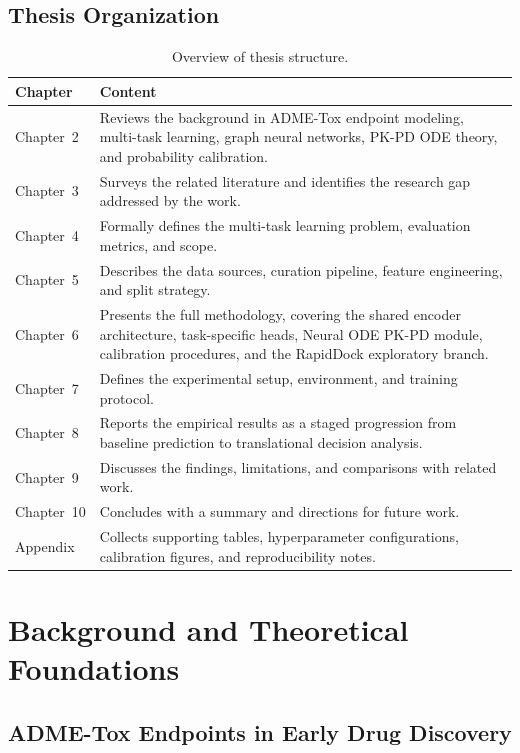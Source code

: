 \documentclass[a4paper,11pt,twoside]{report}
\begin{document}
\section{Thesis Organization}

\begin{table}[htbp]
\centering
\small
\caption{Overview of thesis structure.}
\begin{tabular}{p{2.8cm} p{9.5cm}}
\hline
\textbf{Chapter} & \textbf{Content} \\
\hline
Chapter~2 & Reviews the background in ADME-Tox endpoint modeling, multi-task learning, graph neural networks, PK-PD ODE theory, and probability calibration. \\[4pt]
Chapter~3 & Surveys the related literature and identifies the research gap addressed by the work. \\[4pt]
Chapter~4 & Formally defines the multi-task learning problem, evaluation metrics, and scope. \\[4pt]
Chapter~5 & Describes the data sources, curation pipeline, feature engineering, and split strategy. \\[4pt]
Chapter~6 & Presents the full methodology, covering the shared encoder architecture, task-specific heads, Neural ODE PK-PD module, calibration procedures, and the RapidDock exploratory branch. \\[4pt]
Chapter~7 & Defines the experimental setup, environment, and training protocol. \\[4pt]
Chapter~8 & Reports the empirical results as a staged progression from baseline prediction to translational decision analysis. \\[4pt]
Chapter~9 & Discusses the findings, limitations, and comparisons with related work. \\[4pt]
Chapter~10 & Concludes with a summary and directions for future work. \\[4pt]
Appendix & Collects supporting tables, hyperparameter configurations, calibration figures, and reproducibility notes. \\
\hline
\end{tabular}
\end{table}

\chapter{Background and Theoretical Foundations}

\section{ADME-Tox Endpoints in Early Drug Discovery}
\end{document}
